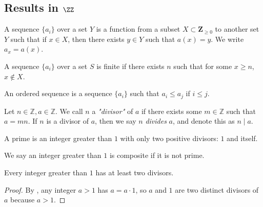 \subsection{Results in $\ZZ$}

\begin{definition}[Sequences]\label{sequence} A sequence $\{ a_i \}$ over a set $Y$ is a function from a subset $X \subset \mathbf{Z}_{\ge 0}$ to another set $Y$ such that if $x \in X$, then there exists $y \in Y$ such that $a(x) = y$. We write $a_x = a(x)$.
\end{definition}

\begin{definition}\label{finite_sequence} A sequence $\{ a_i \}$ over a set $S$ is finite if there exists $n$ such that for some $x \ge n$, $x \notin X$.
\end{definition}

\begin{definition}\label{ordered_sequence}
    An ordered sequence is a sequence $\{ a_i \}$ such that $a_i\leq a_j$ if $i\leq j$.
\end{definition}

\begin{definition}[Divisor] \label{divisor}
\noindent Let $n \in \mathbb{Z}, a \in \mathbb{Z}$. We call $n$ a \textit{"divisor"} of $a$ if there exists some $m \in \mathbb{Z}$ such that $a = mn$. If $n$ is a divisor of $a$, then we say $n$ \textit{divides} $a$, and denote this as $n \mid a$.
\end{definition}

\begin{definition}[Primes]\label{def_prime}
    A prime is an integer greater than $1$ with only two positive divisors: $1$ and itself. 
\end{definition}

\begin{definition}[Composites]\label{def_composite}
    We say an integer greater than $1$ is composite if it is not prime.
\end{definition}

\begin{lemma}\label{atleast2divisors}
    Every integer greater than $1$ has at least two divisors.
\end{lemma}
\begin{proof}
    By , any integer $a>1$ has $a=a\cdot 1$, so $a$ and $1$ are two distinct divisors of $a$ because $a>1$.
\end{proof}

